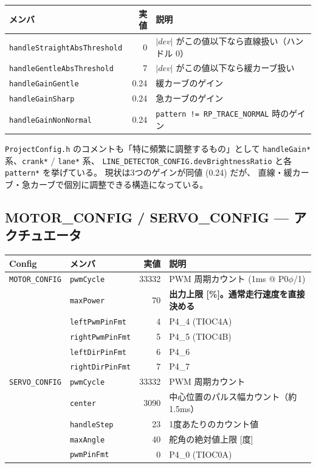 \documentclass[a4paper,11pt,dvipdfmx]{jsarticle}
\begin{document}
\begin{tabularx}{\textwidth}{l r X}
\toprule
\textbf{メンバ} & \textbf{実値} & \textbf{説明} \\
\midrule
\texttt{handleStraightAbsThreshold} & 0    & $|\mathit{dev}|$ がこの値以下なら直線扱い（ハンドル 0） \\
\texttt{handleGentleAbsThreshold}   & 7    & $|\mathit{dev}|$ がこの値以下なら緩カーブ扱い \\
\texttt{handleGainGentle}           & 0.24 & 緩カーブのゲイン \\
\texttt{handleGainSharp}            & 0.24 & 急カーブのゲイン \\
\texttt{handleGainNonNormal}        & 0.24 & \texttt{pattern != RP\_TRACE\_NORMAL} 時のゲイン \\
\bottomrule
\end{tabularx}

\begin{notebox}[調整の入口はここ]
\texttt{ProjectConfig.h} のコメントも「特に頻繁に調整するもの」として
\texttt{handleGain*} 系、\texttt{crank*} / \texttt{lane*} 系、
\texttt{LINE\_DETECTOR\_CONFIG.devBrightnessRatio} と各 \texttt{pattern*} を挙げている。
現状は3つのゲインが同値 (0.24) だが、
直線・緩カーブ・急カーブで個別に調整できる構造になっている。
\end{notebox}

\subsection{MOTOR\_CONFIG / SERVO\_CONFIG --- アクチュエータ}\label{sec:params-act}

\begin{tabularx}{\textwidth}{l l r X}
\toprule
\textbf{Config} & \textbf{メンバ} & \textbf{実値} & \textbf{説明} \\
\midrule
\texttt{MOTOR\_CONFIG} & \texttt{pwmCycle}       & 33332 & PWM 周期カウント (1ms @ P0$\phi$/1) \\
                       & \texttt{maxPower}       & 70    & \textbf{出力上限 [\%]。通常走行速度を直接決める} \\
                       & \texttt{leftPwmPinFmt}  & 4     & P4\_4 (TIOC4A) \\
                       & \texttt{rightPwmPinFmt} & 5     & P4\_5 (TIOC4B) \\
                       & \texttt{leftDirPinFmt}  & 6     & P4\_6 \\
                       & \texttt{rightDirPinFmt} & 7     & P4\_7 \\
\midrule
\texttt{SERVO\_CONFIG} & \texttt{pwmCycle}   & 33332 & PWM 周期カウント \\
                       & \texttt{center}     & 3090  & 中心位置のパルス幅カウント（約 1.5ms） \\
                       & \texttt{handleStep} & 23    & 1度あたりのカウント値 \\
                       & \texttt{maxAngle}   & 40    & 舵角の絶対値上限 [度] \\
                       & \texttt{pwmPinFmt}  & 0     & P4\_0 (TIOC0A) \\
\bottomrule
\end{tabularx}
\end{document}

